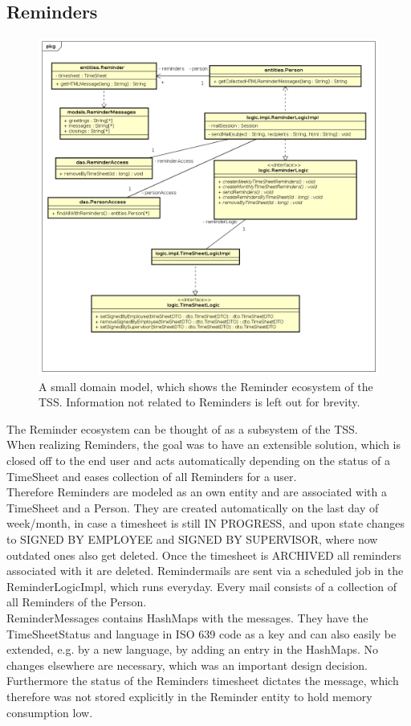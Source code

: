 \documentclass{article}
\begin{document}
\subsection{Reminders}
\begin{figure}[h]
\caption{A small domain model, which shows the Reminder ecosystem of the TSS. Information not related to Reminders is left out for brevity.}
\centering
\includegraphics[width=\textwidth]{reminder_ecosystem}
\end{figure}
The Reminder ecosystem can be thought of as a subsystem of the TSS. \\ When realizing Reminders, the goal was to have an extensible solution, which is closed off to the end user and acts automatically depending on the status of a TimeSheet and eases collection of all Reminders for a user.\\
Therefore Reminders are modeled as an own entity and are associated with a TimeSheet and a Person. They are created automatically on the last day of week/month, in case a timesheet is still IN PROGRESS, and upon state changes to SIGNED BY EMPLOYEE and SIGNED BY SUPERVISOR, where now outdated ones also get deleted. Once the timesheet is ARCHIVED all reminders associated with it are deleted. Remindermails are sent via a scheduled job in the ReminderLogicImpl, which runs everyday. Every mail consists of a collection of all Reminders of the Person. \\ ReminderMessages contains HashMaps with the messages. They have the TimeSheetStatus and language in ISO 639 code as a key and can also easily be extended, e.g. by a new language, by adding an entry in the HashMaps. No changes elsewhere are necessary, which was an important design decision. Furthermore the status of the Reminders timesheet dictates the message, which therefore was not stored explicitly in the Reminder entity to hold memory consumption low.
\end{document}

